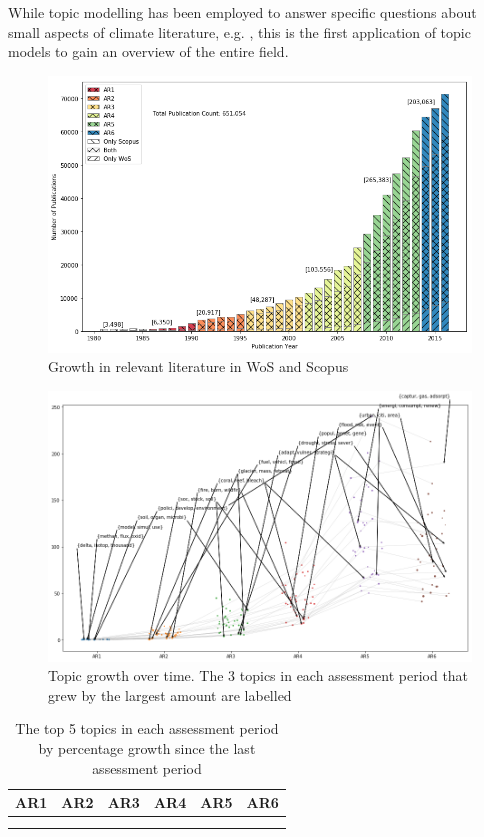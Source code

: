 \documentclass{article}
\begin{document}
While topic modelling has been employed to answer specific questions about small aspects of climate literature, e.g. \citep[e.g.][]{minx2016negative,Grubert2016}, this is the first application of topic models to gain an overview of the entire field.



\begin{figure}
	\includegraphics[width=\linewidth]{plots/wos_scopus_docs_time}
    \caption{Growth in relevant literature in WoS and Scopus}
    \label{growth}
\end{figure}


\begin{figure}
	\includegraphics[width=\linewidth]{plots/hot_topics}
    \caption{Topic growth over time. The 3 topics in each assessment period that grew by the largest amount are labelled}
\end{figure}

\begin{table}
\small
\setlength\tabcolsep{0.1cm}
\begin{tabular}{cccccc}
AR1 & AR2 & AR3 & AR4 & AR5 & AR6 \\
\midrule \\
 &   & 
 &   &   & 
\end{tabular}
\caption{The top 5 topics in each assessment period by percentage growth since the last assessment period}
\end{table}
\end{document}

